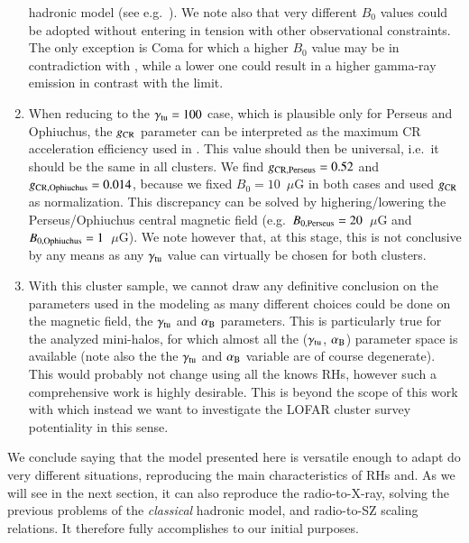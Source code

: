 \documentclass[traditabstract]{aa}
\begin{document}
\begin{enumerate}
       hadronic model (see e.g.~\citealp{2011ApJ...728...53J}). We note also that very different $B_{0}$ values could be adopted without entering 
       in tension with other observational constraints. The only exception is Coma for which a higher $B_{0}$ value may be in contradiction 
       with \cite{2010A&A...513A..30B}, while a lower one could result in a higher gamma-ray emission in contrast with the \cite{2012AAS...21920701Z}
       limit.
 \item When reducing to the $\gamma_{\rm{tu}}=100$ case, which is plausible only for Perseus and Ophiuchus, the $g_{\rm{CR}}$ parameter can be interpreted as the maximum
       CR acceleration efficiency used in \cite{2010MNRAS.409..449P}. This value should then be universal, i.e.~it should be the same in all clusters. We find 
       $g_{\rm{CR, Perseus}} = 0.52$ and $g_{\rm{CR, Ophiuchus}} = 0.014$, because we fixed $B_{0}=10$~$\mu$G in both cases and used $g_{\rm{CR}}$ as normalization. This 
       discrepancy can be solved by highering/lowering the Perseus/Ophiuchus central magnetic field (e.g.~$B_{0,\rm{Perseus}}=20$~$\mu$G and 
       $B_{0,\rm{Ophiuchus}}=1$~$\mu$G). We note however that, at this stage, this is not conclusive by any means as any $\gamma_{\rm{tu}}$ value can 
       virtually be chosen for both clusters. 
 \item With this cluster sample, we cannot draw any definitive conclusion on the parameters used in the modeling as many different choices could be done on
       the magnetic field, the $\gamma_{\rm{tu}}$ and $\alpha_{\rm{B}}$ parameters. This is particularly true for the analyzed mini-halos, for which almost all the
       ($\gamma_{\rm{tu}}$, $\alpha_{\rm{B}}$) parameter space is available (note also the the $\gamma_{\rm{tu}}$ and $\alpha_{\rm{B}}$ variable are of course degenerate). This 
       would probably not change using all the knows RHs, however such a comprehensive work is highly desirable. This is beyond the scope of this work with which instead we 
       want to investigate the LOFAR cluster survey potentiality in this sense.
\end{enumerate}

We conclude saying that the model presented here is versatile enough to adapt do very different situations, reproducing the main characteristics of RHs and. As we will see in
the next section, it can also reproduce the radio-to-X-ray, solving the previous problems of the \emph{classical} hadronic model, and radio-to-SZ scaling relations. It therefore fully accomplishes to our initial purposes.
\end{document}
